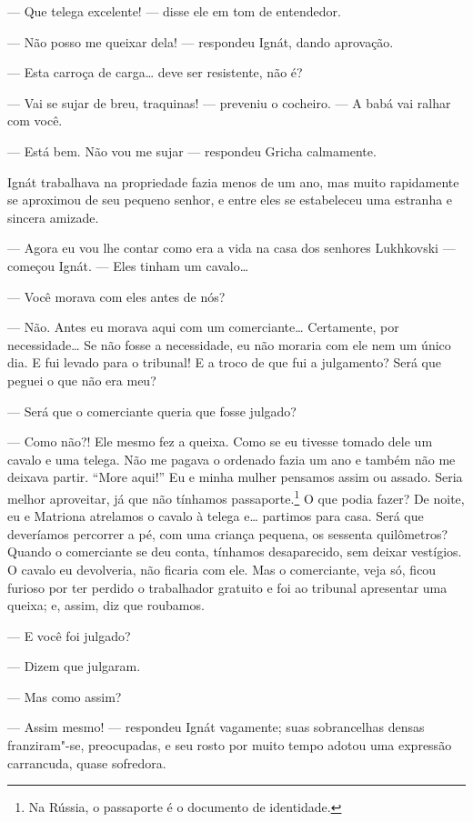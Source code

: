 --- Que telega excelente! --- disse ele em tom de entendedor.

--- Não posso me queixar dela! --- respondeu Ignát, dando aprovação.

--- Esta carroça de carga\ldots{} deve ser resistente, não é?

--- Vai se sujar de breu, traquinas! --- preveniu o cocheiro. --- A babá
vai ralhar com você.

--- Está bem. Não vou me sujar --- respondeu Gricha calmamente.

Ignát trabalhava na propriedade fazia menos de um ano, mas muito
rapidamente se aproximou de seu pequeno senhor, e entre eles se
estabeleceu uma estranha e sincera amizade.

--- Agora eu vou lhe contar como era a vida na casa dos senhores
Lukhkovski --- começou Ignát. --- Eles tinham um cavalo\ldots{}

--- Você morava com eles antes de nós?

--- Não. Antes eu morava aqui com um comerciante\ldots{} Certamente, por
necessidade\ldots{} Se não fosse a necessidade, eu não moraria com ele nem um
único dia. E fui levado para o tribunal! E a troco de que fui a
julgamento? Será que peguei o que não era meu?

--- Será que o comerciante queria que fosse julgado?

--- Como não?! Ele mesmo fez a queixa. Como se eu tivesse tomado dele um
cavalo e uma telega. Não me pagava o ordenado fazia um ano e também não
me deixava partir. ``More aqui!'' Eu e minha mulher pensamos assim ou
assado. Seria melhor aproveitar, já que não tínhamos
passaporte.\footnote{Na Rússia, o passaporte é o documento de
  identidade.} O que podia fazer? De noite, eu e Matriona atrelamos o
cavalo à telega e\ldots{} partimos para casa. Será que deveríamos percorrer a
pé, com uma criança pequena, os sessenta quilômetros? Quando o
comerciante se deu conta, tínhamos desaparecido, sem deixar vestígios. O
cavalo eu devolveria, não ficaria com ele. Mas o comerciante, veja só,
ficou furioso por ter perdido o trabalhador gratuito e foi ao tribunal
apresentar uma queixa; e, assim, diz que roubamos.

--- E você foi julgado?

--- Dizem que julgaram.

--- Mas como assim?

--- Assim mesmo! --- respondeu Ignát vagamente; suas sobrancelhas densas
franziram"-se, preocupadas, e seu rosto por muito tempo adotou uma
expressão carrancuda, quase sofredora.

